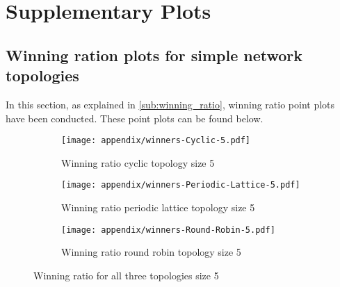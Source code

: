 \begin{table}[H]
\caption{List of Axelrod-Python strategies part 3}
\end{table}

\section{Supplementary Plots}
\subsection{Winning ration plots for simple network topologies}
\label{append:wining-ratio-further-plot}
In this section, as explained in \autoref{sub:winning_ratio}, winning ratio point plots
have been conducted. These point plots can be found below.
\begin{figure}[H]
	\centering
	\begin{subfigure}[t]{0.65\textwidth}
		\centering
		\texttt{[image: appendix/winners-Cyclic-5.pdf]}
		\caption{Winning ratio cyclic topology size 5}
	\end{subfigure}
	\hfill
	\begin{subfigure}[t]{0.65\textwidth}\centering
		\centering
		\texttt{[image: appendix/winners-Periodic-Lattice-5.pdf]}
		\caption{Winning ratio periodic lattice topology size 5}
	\end{subfigure}
	\hfill
	\begin{subfigure}[t]{0.65\textwidth}\centering
		\centering
		\texttt{[image: appendix/winners-Round-Robin-5.pdf]}
		\caption{Winning ratio round robin topology size 5}
	\end{subfigure}
	\caption{Winning ratio for all three topologies size 5}
	\label{fig:winning-five}
\end{figure}

